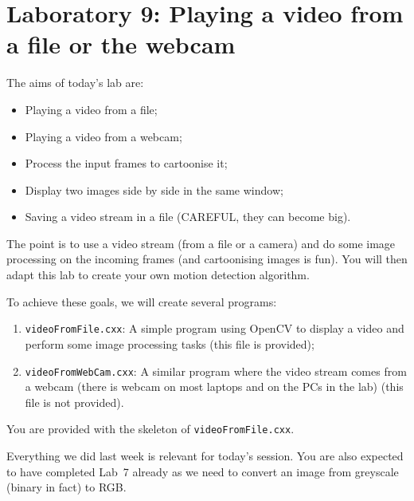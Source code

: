 \documentclass[english,a4paper,12pt,oneside]{article}
\begin{document}
\section*{Laboratory 9: Playing a video from a file or the webcam}


The aims of today's lab are:
\begin{itemize}
	\item Playing a video from a file;
	\item Playing a video from a webcam;
	\item Process the input frames to cartoonise it;
	\item Display two images side by side in the same window;
	\item Saving a video stream in a file (CAREFUL, they can become big).
\end{itemize}
The point is to use a video stream (from a file or a camera) and do some image processing on the incoming frames (and cartoonising images is fun). You will then adapt this lab to create your own motion detection algorithm. 

To achieve these goals, we will create several programs:
\begin{enumerate}
	\item \verb+videoFromFile.cxx+: A simple program using OpenCV to display a video and perform some image processing tasks (this file is provided);
	\item \verb+videoFromWebCam.cxx+: A similar program where the video stream comes from a webcam (there is webcam on most laptops and on the PCs in the lab) (this file is not provided).
\end{enumerate}
You are provided with the skeleton of \verb+videoFromFile.cxx+. 

Everything we did last week is relevant for today's session. 
You are also expected to have completed Lab~7 already as we need to convert an image from greyscale (binary in fact) to RGB. 
\end{document}
